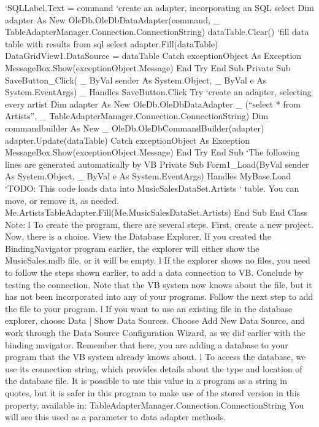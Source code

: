 			‘SQLLabel.Text = command
			‘create an adapter, incorporating an SQL select
			Dim adapter As New OleDb.OleDbDataAdapter(command, _
				TableAdapterManager.Connection.ConnectionString)
			dataTable.Clear()
			‘fill data table with results from sql select
			adapter.Fill(dataTable)
			DataGridView1.DataSource = dataTable
		Catch exceptionObject As Exception
			MessageBox.Show(exceptionObject.Message)
		End Try
	End Sub
	Private Sub SaveButton_Click( _
		 ByVal sender As System.Object, _
		 ByVal e As System.EventArgs) _
		 Handles SaveButton.Click
		Try
			‘create an adapter, selecting every artist
			Dim adapter As New OleDb.OleDbDataAdapter _
				(“select * from Artists”, _
				 TableAdapterManager.Connection.ConnectionString)
			Dim commandbuilder As New _
					OleDb.OleDbCommandBuilder(adapter)
			adapter.Update(dataTable)
		Catch exceptionObject As Exception
			MessageBox.Show(exceptionObject.Message)
		End Try
	End Sub
	‘The following lines are generated automatically by VB
	Private Sub Form1_Load(ByVal sender As System.Object, _
		ByVal e As System.EventArgs) Handles MyBase.Load
		‘TODO: This code loads data into MusicSalesDataSet.Artists
		‘ table. You can move, or remove it, as needed.
		Me.ArtistsTableAdapter.Fill(Me.MusicSalesDataSet.Artists)
	End Sub
End Class
Note:
l	To create the program, there are several steps. First, create a new project. 
Now, there is a choice. View the Database Explorer. If you created the BindingNavigator program earlier, the explorer will either show the MusicSales.mdb file, or it will be empty.
l	If the explorer shows no files, you need to follow the steps shown earlier, to add 
a data connection to VB. Conclude by testing the connection. Note that the VB system now knows about the file, but it has not been incorporated into any of your programs. Follow the next step to add the file to your program.
l	If you want to use an existing file in the database explorer, choose Data | Show Data Sources. Choose Add New Data Source, and work through the Data Source Conﬁguration Wizard, as we did earlier with the binding navigator. Remember that here, you are adding a database to your program that the VB system already knows about.
l	To access the database, we use its connection string, which provides details about the type and location of the database file. It is possible to use this value in a program as a string in quotes, but it is safer in this program to make use of the stored version in this property, available in:
TableAdapterManager.Connection.ConnectionString
	You will see this used as a parameter to data adapter methods.

